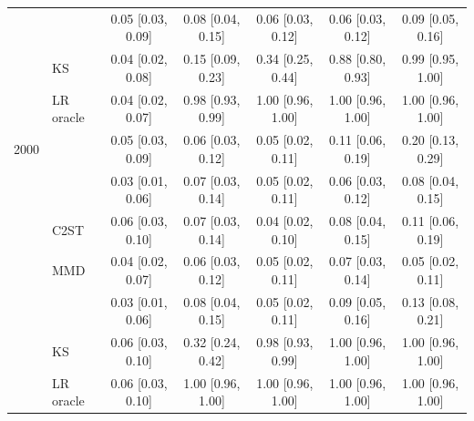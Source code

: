 \begin{tabular}{rlccccc}
 & \SigMMD{} & 0.05 [0.03, 0.09] & 0.08 [0.04, 0.15] & 0.06 [0.03, 0.12] & 0.06 [0.03, 0.12] & 0.09 [0.05, 0.16] \\
 & KS & 0.04 [0.02, 0.08] & 0.15 [0.09, 0.23] & 0.34 [0.25, 0.44] & 0.88 [0.80, 0.93] & 0.99 [0.95, 1.00] \\
 & LR oracle & 0.04 [0.02, 0.07] & 0.98 [0.93, 0.99] & 1.00 [0.96, 1.00] & 1.00 [0.96, 1.00] & 1.00 [0.96, 1.00] \\
2000 & \WC{} & 0.05 [0.03, 0.09] & 0.06 [0.03, 0.12] & 0.05 [0.02, 0.11] & 0.11 [0.06, 0.19] & 0.20 [0.13, 0.29] \\
 & \LRC{} & 0.03 [0.01, 0.06] & 0.07 [0.03, 0.14] & 0.05 [0.02, 0.11] & 0.06 [0.03, 0.12] & 0.08 [0.04, 0.15] \\
 & C2ST & 0.06 [0.03, 0.10] & 0.07 [0.03, 0.14] & 0.04 [0.02, 0.10] & 0.08 [0.04, 0.15] & 0.11 [0.06, 0.19] \\
 & MMD & 0.04 [0.02, 0.07] & 0.06 [0.03, 0.12] & 0.05 [0.02, 0.11] & 0.07 [0.03, 0.14] & 0.05 [0.02, 0.11] \\
 & \SigMMD{} & 0.03 [0.01, 0.06] & 0.08 [0.04, 0.15] & 0.05 [0.02, 0.11] & 0.09 [0.05, 0.16] & 0.13 [0.08, 0.21] \\
 & KS & 0.06 [0.03, 0.10] & 0.32 [0.24, 0.42] & 0.98 [0.93, 0.99] & 1.00 [0.96, 1.00] & 1.00 [0.96, 1.00] \\
 & LR oracle & 0.06 [0.03, 0.10] & 1.00 [0.96, 1.00] & 1.00 [0.96, 1.00] & 1.00 [0.96, 1.00] & 1.00 [0.96, 1.00] \\
\bottomrule
\end{tabular}
